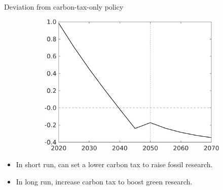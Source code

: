\documentclass[11pt,aspectratio=169]{beamer}
\begin{document}
\begin{frame}{Deviation from carbon-tax-only policy}
\begin{figure}
\begin{subfigure}{0.4\textwidth}
	\includegraphics[width=1\textwidth]{../codding_model/own_basedOnFried/optimalPol_010922_revision/figures/all_13Sept22_Tplus30/sffsg_OPT_T_NoTaus_COMPtaulPer_regime4_spillover0_knspil0_noskill0_sep0_xgrowth0_PV1_etaa0.79.png}
\end{subfigure}
	\end{figure}
\vspace{3mm}
\pause
\begin{block}{}
\begin{itemize}
	\item<+-> In short run, can set a lower carbon tax to raise fossil research.
	\item<+-> In long run, increase carbon tax to boost green research.
\end{itemize}
\end{block}	
\end{frame}
\end{document}

